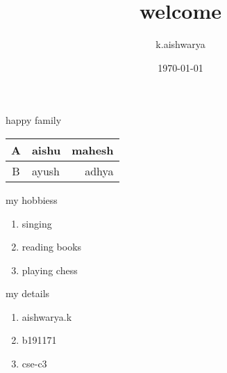 \documentclass{beamer}
\title{welcome}
\author{k.aishwarya}
\date{\today}
\begin{document}
    \begin{frame}{happy family}
 \begin{tabular}{|c||l||r|}
\hline
\hline
   A & aishu& mahesh\\ 
\hline
    B & ayush & adhya\\ 
\hline
\end{tabular}
\end{frame}
\begin{frame}{my hobbiess}
\begin{enumerate}
     \item singing
    \item reading books
    \item playing chess
\end{enumerate}
\end{frame}
\begin{frame}{my details}
\begin{enumerate}
    \item aishwarya.k
    \item b191171
    \item cse-c3
\end{enumerate}
    
\end{frame}
\end{document}
